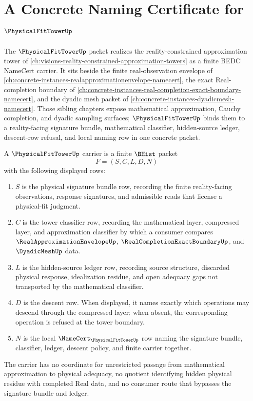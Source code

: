\chapter{A Concrete Naming Certificate for $\PhysicalFitTowerUp$}
\label{ch:concrete-instances-physical-fit-tower-namecert}

The $\PhysicalFitTowerUp$ packet realizes the reality-constrained approximation tower of \autoref{ch:visions-reality-constrained-approximation-towers} as a finite BEDC NameCert carrier. It sits beside the finite real-observation envelope of \autoref{ch:concrete-instances-realapproximationenvelope-namecert}, the exact Real-completion boundary of \autoref{ch:concrete-instances-real-completion-exact-boundary-namecert}, and the dyadic mesh packet of \autoref{ch:concrete-instances-dyadicmesh-namecert}. Those sibling chapters expose mathematical approximation, Cauchy completion, and dyadic sampling surfaces; $\PhysicalFitTowerUp$ binds them to a reality-facing signature bundle, mathematical classifier, hidden-source ledger, descent-row refusal, and local naming row in one concrete packet.

\begin{definition}
\label{def:physical-fit-tower-carrier}
A $\PhysicalFitTowerUp$ carrier is a finite $\BHist$ packet
$$
F=(S,C,L,D,N)
$$
with the following displayed rows:
\begin{enumerate}
\item $S$ is the physical signature bundle row, recording the finite reality-facing observations, response signatures, and admissible reads that license a physical-fit judgment.
\item $C$ is the tower classifier row, recording the mathematical layer, compressed layer, and approximation classifier by which a consumer compares $\RealApproximationEnvelopeUp$, $\RealCompletionExactBoundaryUp$, and $\DyadicMeshUp$ data.
\item $L$ is the hidden-source ledger row, recording source structure, discarded physical response, idealization residue, and open adequacy gaps not transported by the mathematical classifier.
\item $D$ is the descent row. When displayed, it names exactly which operations may descend through the compressed layer; when absent, the corresponding operation is refused at the tower boundary.
\item $N$ is the local $\NameCert_{\PhysicalFitTowerUp}$ row naming the signature bundle, classifier, ledger, descent policy, and finite carrier together.
\end{enumerate}
The carrier has no coordinate for unrestricted passage from mathematical approximation to physical adequacy, no quotient identifying hidden physical residue with completed Real data, and no consumer route that bypasses the signature bundle and ledger.
\end{definition}


